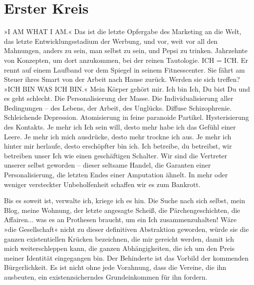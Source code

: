 \section{Erster Kreis}


»I AM WHAT I AM.« Das ist die letzte Opfergabe des Marketing an die
Welt, das letzte Entwicklungsstadium der Werbung, und vor, weit vor
all den Mahnungen, anders zu sein, man selbst zu sein, und Pepsi zu
trinken. Jahrzehnte von Konzepten, um dort anzukommen, bei der
reinen Tautologie. ICH = ICH. Er rennt auf einem Laufband vor dem
Spiegel in seinem Fitnesscenter. Sie fährt am Steuer ihres Smart
von der Arbeit nach Hause zurück. Werden sie sich treffen?
»ICH BIN WAS ICH BIN.« Mein Körper gehört mir. Ich bin Ich, Du bist
Du und es geht schlecht. Die Personalisierung der Masse. Die
Individualisierung aller Bedingungen – des Lebens, der Arbeit, des
Unglücks. Diffuse Schizophrenie. Schleichende Depression.
Atomisierung in feine paranoide Partikel. Hysterisierung des
Kontakts. Je mehr ich Ich sein will, desto mehr habe ich das Gefühl
einer Leere. Je mehr ich mich ausdrücke, desto mehr trockne ich
aus. Je mehr ich hinter mir herlaufe, desto erschöpfter bin ich.
Ich betreibe, du betreibst, wir betreiben unser Ich wie einen
geschäftigen Schalter. Wir sind die Vertreter unserer selbst
geworden – dieser seltsame Handel, die Garanten einer
Personalisierung, die letzten Endes einer Amputation ähnelt. In
mehr oder weniger versteckter Unbeholfenheit schaffen wir es zum
Bankrott.

Bis es soweit ist, verwalte ich, kriege ich es hin. Die Suche nach
sich selbst, mein Blog, meine Wohnung, der letzte angesagte Scheiß,
die Pärchengeschichten, die Affairen... was es an Prothesen
braucht, um ein Ich zusammenzuhalten! Wäre »die Gesellschaft« nicht
zu dieser definitiven Abstraktion geworden, würde sie die ganzen
existentiellen Krücken bezeichnen, die mir gereicht werden, damit
ich mich weiterschleppen kann, die ganzen Abhängigkeiten, die ich
um den Preis meiner Identität eingegangen bin. Der Behinderte ist
das Vorbild der kommenden Bürgerlichkeit. Es ist nicht ohne jede
Vorahnung, dass die Vereine, die ihn ausbeuten, ein
existenzsicherndes Grundeinkommen für ihn fordern.

\extrapar{}

